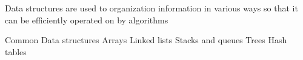 Data structures 
  are used to organization information in various ways 
  so that it can be efficiently operated on by algorithms

Common Data structures 
  Arrays 
  Linked lists
  Stacks and queues 
  Trees 
  Hash tables 